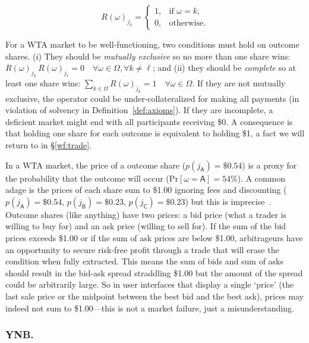 \begin{equation}
R(\omega)_{j_{k}}=\begin{cases}1, & \text{if } \omega=k,\\0, & \text{otherwise.}\end{cases}
\end{equation}

For a WTA market to be well-functioning, two conditions must hold on outcome shares. (i) They should be \textit{mutually exclusive} so no more than one share wins: $R(\omega)_{j_{k}}\,R(\omega)_{j_{\mathsf{\ell}}}=0 \quad \forall\omega\in\Omega, \forall k\neq\mathsf{\ell} $; and (ii) they should be \textit{complete} so at least one share wins: $\sum_{k\in\Omega} R(\omega)_{j_{k}}=1\quad \forall \omega\in\Omega$. If they are not mutually exclusive, the operator could be under-collateralized for making all payments (in violation of solvency in Definition~\ref{def:axioms}). If they are incomplete, a deficient market might end with all participants receiving \$0. A consequence is that holding one share for each outcome is equivalent to holding \$1, a fact we will return to in \S\ref{wf:trade}. 

In a WTA market, the price of a outcome share (\eg $p(j_\mathsf{A})=\$0.54$) is a proxy for the probability that the outcome will occur (\eg $\mathrm{Pr}[\omega=\mathsf{A}]=54\%$). A common adage is the prices of each share sum to \$1.00 ignoring fees and discounting (\eg $p(j_\mathsf{A})=\$0.54$, $p(j_\mathsf{B})=\$0.23$, $p(j_\mathsf{C})=\$0.23$) but this is imprecise~\cite{BCFKMN14}. Outcome shares (like anything) have two prices: a bid price (what a trader is willing to buy for) and an ask price (willing to sell for). If the sum of the bid prices exceeds \$1.00 or if the sum of ask prices are below \$1.00, arbitrageurs have an opportunity to secure risk-free profit through a trade that will erase the condition when fully extracted. This means the sum of bids and sum of asks should result in the bid-ask spread straddling \$1.00 but the amount of the spread could be arbitrarily large. So in user interfaces that display a single `price' (\eg the last sale price or the midpoint between the best bid and the best ask), prices may indeed not sum to \$1.00---this is not a market failure, just a misunderstanding. 

 
 \subsubsection{YNB.}
 
